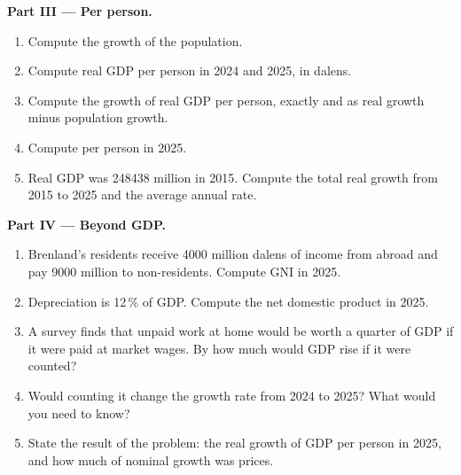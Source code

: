 \begin{problem}
\medskip
\noindent\textbf{Part III --- Per person.}
\begin{enumerate}[resume]
\item Compute the growth of the population.
\item Compute real GDP per person in 2024 and 2025, in dalens.
\item Compute the growth of real GDP per person, exactly and as real growth minus population growth.
\item Compute  per person in 2025.
\item Real GDP was \num{248438} million in 2015. Compute the total real growth from 2015 to 2025 and the average annual rate.
\end{enumerate}

\medskip
\noindent\textbf{Part IV --- Beyond GDP.}
\begin{enumerate}[resume]
\item Brenland's residents receive \num{4000} million dalens of income from abroad and pay \num{9000} million to non-residents. Compute GNI in 2025.
\item Depreciation is 12\,\% of GDP. Compute the net domestic product in 2025.
\item A survey finds that unpaid work at home would be worth a quarter of GDP if it were paid at market wages. By how much would GDP rise if it were counted?
\item Would counting it change the growth rate from 2024 to 2025? What would you need to know?
\item State the result of the problem: the real growth of GDP per person in 2025, and how much of nominal growth was prices.
\end{enumerate}
\end{problem}
